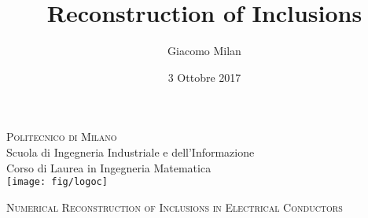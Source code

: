 \documentclass[10pt,xcolor={dvipsnames}]{beamer}
\title{Reconstruction of Inclusions}
\author{Giacomo Milan}
\date{3 Ottobre 2017}
\theoremstyle{plain}
\theoremstyle{plain}
\begin{document}
\begin{frame}
    \begin{center}
        \normalsize
        \textsc{Politecnico di Milano}\\
        Scuola di Ingegneria Industriale e dell'Informazione\\
        Corso di Laurea in Ingegneria Matematica\\
        \vspace{0.7cm}
        \texttt{[image: fig/logoc]}
        

        \vspace{0.4cm}
        \Large
        \textsc{Numerical Reconstruction of Inclusions in Electrical Conductors}
        
        \vspace{0.3cm}
        
    \end{center}

\end{frame}
\end{document}
